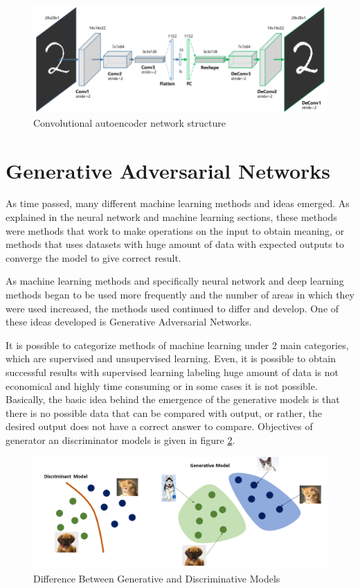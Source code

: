 \begin{figure}[h]
    \centering
    \includegraphics[width=13cm]{figures/chapter3/mnist_autoencoder.png}
    \caption{Convolutional autoencoder network structure \cite{autoencoders}}
    \label{fig:mnist_autoencoder}
\end{figure}

\section{Generative Adversarial Networks}

As time passed, many different machine learning methods and ideas emerged. As explained in the neural network and machine learning sections, these methods were methods that work to make operations on the input to obtain meaning, or methods that uses datasets with huge amount of data with expected outputs to converge the model to give correct result.

As machine learning methods and specifically neural network and deep learning methods began to be used more frequently and the number of areas in which they were used increased, the methods used continued to differ and develop. One of these ideas developed is Generative Adversarial Networks.

It is possible to categorize methods of machine learning under 2 main categories, which are supervised and unsupervised learning. Even, it is possible to obtain successful results with supervised learning labeling huge amount of data is not economical and highly time consuming or in some cases it is not possible. Basically, the basic idea behind the emergence of the generative models is that there is no possible data that can be compared with output, or rather, the desired output does not have a correct answer to compare. Objectives of generator an discriminator models is given in figure \ref{fig:gan1}.

\begin{figure}[h]
    \centering
    \includegraphics[scale=0.5]{figures/chapter3/generative-vs-discriminative-example.png}
    \caption{Difference Between Generative and Discriminative Models}
    \label{fig:gan1}
\end{figure}

